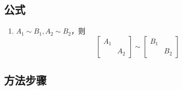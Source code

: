 \documentclass[a4paper,12pt]{article}
\begin{document}
    \subsection{公式}

    \begin{enumerate}
        \item $A_1 \sim B_1, A_2 \sim B_2$，则
        \[
            \begin{bmatrix}
                A_1 &     \\
                & A_2
            \end{bmatrix} \sim \begin{bmatrix}
                                   B_1 &     \\
                                   & B_2
            \end{bmatrix}
        \]

    \end{enumerate}

    \subsection{方法步骤}
\end{document}
